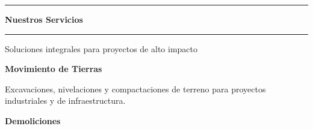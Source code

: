 \documentclass[a4paper,11pt]{article}
\begin{document}
\colorbox{blancoJM}{\parbox{21cm}{
    {\color{azulJM}\rule{2cm}{1cm}}
    
    \vspace{0.8cm}
    
    \vspace{2cm}
    
    \begin{center}
        {\fontsize{38}{42}\selectfont\color{azulJM}\textbf{Nuestros Servicios}}
        
        \vspace{0.5cm}
        
        {\color{naranjaJM}\rule{8cm}{3pt}}
        
        \vspace{0.3cm}
        
        {\Large\color{naranjaJM}Soluciones integrales para proyectos de alto impacto}
        
        \vspace{1.5cm}
        
        \begin{minipage}{18cm}
            \begin{minipage}[t]{5.5cm}
                \colorbox{blancoJM}{\parbox[t][4.5cm][t]{5.3cm}{
                    \vspace{0.5cm}
                    \centering
                    {\color{naranjaJM}\faTractor\quad}{\Large\color{azulJM}\textbf{Movimiento de Tierras}}
                    
                    \vspace{0.3cm}
                    
                    {\small Excavaciones, nivelaciones y compactaciones de terreno para proyectos industriales y de infraestructura.}
                    \vspace{0.5cm}
                }}
            \end{minipage}
            \hfill
            \begin{minipage}[t]{5.5cm}
                \colorbox{blancoJM}{\parbox[t][4.5cm][t]{5.3cm}{
                    \vspace{0.5cm}
                    \centering
                    {\color{naranjaJM}\faTools\quad}{\Large\color{azulJM}\textbf{Demoliciones}}
                    
}}
\end{minipage}
\end{minipage}
\end{center}}}
\end{document}

